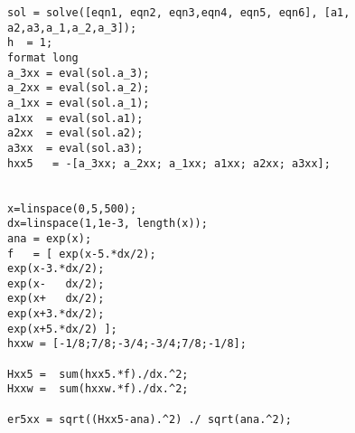 \begin{lstlisting}
sol = solve([eqn1, eqn2, eqn3,eqn4, eqn5, eqn6], [a1, a2,a3,a_1,a_2,a_3]);
h  = 1;
format long
a_3xx = eval(sol.a_3);
a_2xx = eval(sol.a_2);
a_1xx = eval(sol.a_1);
a1xx  = eval(sol.a1);
a2xx  = eval(sol.a2);
a3xx  = eval(sol.a3);
hxx5   = -[a_3xx; a_2xx; a_1xx; a1xx; a2xx; a3xx];


x=linspace(0,5,500);
dx=linspace(1,1e-3, length(x));
ana = exp(x);
f   = [ exp(x-5.*dx/2);
exp(x-3.*dx/2);
exp(x-   dx/2);
exp(x+   dx/2);
exp(x+3.*dx/2);
exp(x+5.*dx/2) ];
hxxw = [-1/8;7/8;-3/4;-3/4;7/8;-1/8];

Hxx5 =  sum(hxx5.*f)./dx.^2;
Hxxw =  sum(hxxw.*f)./dx.^2;

er5xx = sqrt((Hxx5-ana).^2) ./ sqrt(ana.^2);
\end{lstlisting}
